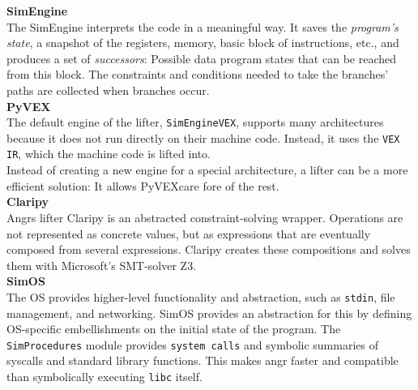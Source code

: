 \documentclass[seminar]{plai}
\begin{document}
\noindent\textbf{SimEngine}\\
The SimEngine interprets the code in a meaningful way. It saves the \textit{program's state}, a snapshot of the registers, memory, basic block of instructions, etc., and produces a set of \textit{successors}: Possible data program states that can be reached from this block.
The constraints and conditions needed to take the branches' paths are collected when branches occur.\\

\noindent\textbf{PyVEX}\\
The default engine of the lifter, \texttt{SimEngineVEX}, supports many architectures because it does not run directly on their machine code. Instead, it uses the \texttt{VEX IR}, which the machine code is lifted into.\cite{angr-internals}\\
Instead of creating a new engine for a special architecture, a lifter can be a more efficient solution: It allows PyVEXcare fore of the rest.\cite{art-of-war-angr}\\

\noindent\textbf{Claripy}\\
Angrs lifter Claripy is an abstracted constraint-solving wrapper.\cite{claripy-documentation} Operations are not represented as concrete values, but as expressions that are eventually composed from several expressions. Claripy creates these compositions and solves them with Microsoft's SMT-solver Z3.\cite{angr-internals}\\

\noindent\textbf{SimOS}\\
The OS provides higher-level functionality and abstraction, such as \texttt{stdin}, file management, and networking. SimOS provides an abstraction for this by defining OS-specific embellishments on the initial state of the program. The \texttt{SimProcedures} module provides \texttt{system calls} and symbolic summaries of syscalls and standard library functions.
This makes angr faster and compatible than symbolically executing \texttt{libc} itself.
\end{document}
